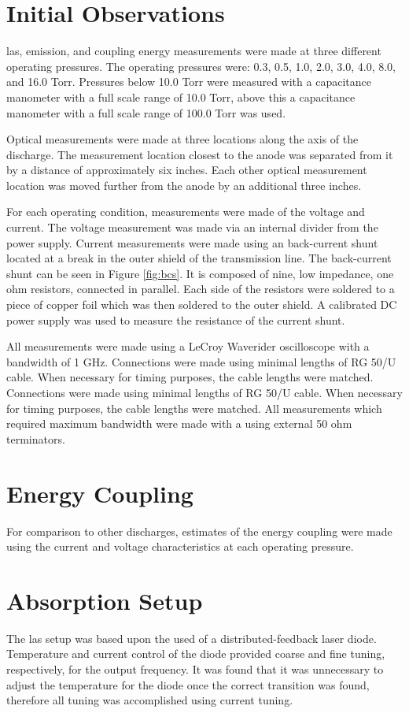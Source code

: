 \section{Initial Observations}

\acs{las}, emission, and coupling energy measurements were made at three
different operating pressures. The operating pressures were: 0.3, 0.5,
1.0, 2.0, 3.0, 4.0, 8.0, and 16.0 Torr. Pressures below 10.0 Torr were
measured with a capacitance manometer with a full scale range of 10.0
Torr, above this a capacitance manometer with a full scale range of
100.0 Torr was used.

Optical measurements were made at three locations along the axis of the
discharge. The measurement location closest to the anode was separated
from it by a distance of approximately six inches. Each other optical
measurement location was moved further from the anode by an additional
three inches.

For each operating condition, measurements were made of the voltage and
current. The voltage measurement was made via an internal divider from
the power supply. Current measurements were made using an back-current
shunt located at a break in the outer shield of the transmission line.
The back-current shunt can be seen in Figure \ref{fig:bcs}. It is
composed of nine, low impedance, one ohm resistors, connected in
parallel. Each side of the resistors were soldered to a piece of copper
foil which was then soldered to the outer shield. A calibrated DC power
supply was used to measure the resistance of the current shunt.

All measurements were made using a LeCroy Waverider oscilloscope with a
bandwidth of 1 GHz. Connections were made using minimal lengths of RG
50/U cable. When necessary for timing purposes, the cable lengths were
matched.  Connections were made using minimal lengths of RG 50/U cable.
When necessary for timing purposes, the cable lengths were matched. All
measurements which required maximum bandwidth were made with a using
external 50 ohm terminators.

\section{Energy Coupling}
For comparison to other discharges, estimates of the energy coupling
were made using the current and voltage characteristics at each
operating pressure.

\section{Absorption Setup}
The \acs{las} setup was based upon the used of a distributed-feedback
laser diode. Temperature and current control of the diode provided
coarse and fine tuning, respectively, for the output frequency. It was
found that it was unnecessary to adjust the temperature for the diode
once the correct transition was found, therefore all tuning was
accomplished using current tuning.

